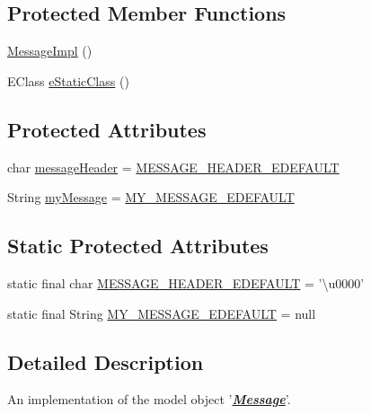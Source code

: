 \subsection*{Protected Member Functions}
\begin{DoxyCompactItemize}
\item 
\hyperlink{classshootingmachineemfmodel_1_1impl_1_1_message_impl_ab57b9e8a0291edde193df55686450ccb}{Message\-Impl} ()
\item 
E\-Class \hyperlink{classshootingmachineemfmodel_1_1impl_1_1_message_impl_a8893a4c90db789a9433ead28b462b9e1}{e\-Static\-Class} ()
\end{DoxyCompactItemize}
\subsection*{Protected Attributes}
\begin{DoxyCompactItemize}
\item 
char \hyperlink{classshootingmachineemfmodel_1_1impl_1_1_message_impl_ac3933f6c5dc6ce4bc2a536817382faff}{message\-Header} = \hyperlink{classshootingmachineemfmodel_1_1impl_1_1_message_impl_a6b7056882680f6da2c478e383741b85a}{M\-E\-S\-S\-A\-G\-E\-\_\-\-H\-E\-A\-D\-E\-R\-\_\-\-E\-D\-E\-F\-A\-U\-L\-T}
\item 
String \hyperlink{classshootingmachineemfmodel_1_1impl_1_1_message_impl_a4fb6f3927dfebddacbd06a8f1994b687}{my\-Message} = \hyperlink{classshootingmachineemfmodel_1_1impl_1_1_message_impl_a90221c62d997569d3a4a57c5a5238633}{M\-Y\-\_\-\-M\-E\-S\-S\-A\-G\-E\-\_\-\-E\-D\-E\-F\-A\-U\-L\-T}
\end{DoxyCompactItemize}
\subsection*{Static Protected Attributes}
\begin{DoxyCompactItemize}
\item 
static final char \hyperlink{classshootingmachineemfmodel_1_1impl_1_1_message_impl_a6b7056882680f6da2c478e383741b85a}{M\-E\-S\-S\-A\-G\-E\-\_\-\-H\-E\-A\-D\-E\-R\-\_\-\-E\-D\-E\-F\-A\-U\-L\-T} = '\textbackslash{}u0000'
\item 
static final String \hyperlink{classshootingmachineemfmodel_1_1impl_1_1_message_impl_a90221c62d997569d3a4a57c5a5238633}{M\-Y\-\_\-\-M\-E\-S\-S\-A\-G\-E\-\_\-\-E\-D\-E\-F\-A\-U\-L\-T} = null
\end{DoxyCompactItemize}


\subsection{Detailed Description}
An implementation of the model object '{\itshape {\bfseries \hyperlink{interfaceshootingmachineemfmodel_1_1_message}{Message}}}'.

